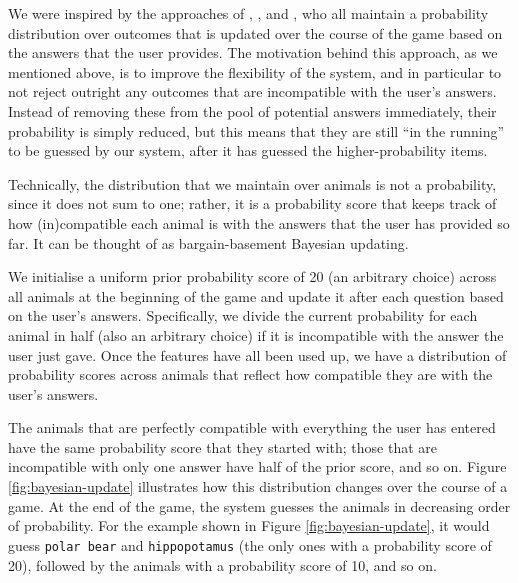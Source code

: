 \documentclass[11pt,a4paper]{article}
\begin{document}
We were inspired by the approaches of \citet{DeyEa2019}, \citet{HuEa2018}, and \citet{Burgener2006}, who all maintain a probability distribution over outcomes that is updated over the course of the game based on the answers that the user provides.
The motivation behind this approach, as we mentioned above, is to improve the flexibility of the system, and in particular to not reject outright any outcomes that are incompatible with the user's answers.
Instead of removing these from the pool of potential answers immediately, their probability is simply reduced, but this means that they are still ``in the running'' to be guessed by our system, after it has guessed the higher-probability items.

Technically, the distribution that we maintain over animals is not a probability, since it does not sum to one; rather, it is a probability score that keeps track of how (in)compatible each animal is with the answers that the user has provided so far.
It can be thought of as bargain-basement Bayesian updating.

We initialise a uniform prior probability score of 20 (an arbitrary choice) across all animals at the beginning of the game and update it after each question based on the user's answers.
Specifically, we divide the current probability for each animal in half (also an arbitrary choice) if it is incompatible with the answer the user just gave.
Once the features have all been used up, we have a distribution of probability scores across animals that reflect how compatible they are with the user's answers.

The animals that are perfectly compatible with everything the user has entered have the same probability score that they started with; those that are incompatible with only one answer have half of the prior score, and so on.
Figure \ref{fig:bayesian-update} illustrates how this distribution changes over the course of a game.
At the end of the game, the system guesses the animals in decreasing order of probability.
For the example shown in Figure \ref{fig:bayesian-update}, it would guess \texttt{polar bear} and \texttt{hippopotamus} (the only ones with a probability score of 20), followed by the animals with a probability score of 10, and so on.
\end{document}
